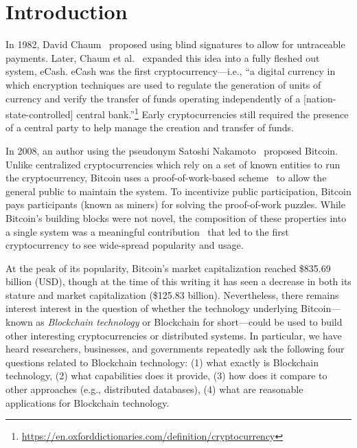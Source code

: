 
\section{Introduction}
In 1982, David Chaum~\cite{Cha82} proposed using blind signatures to allow for untraceable payments.
Later, Chaum et al.~\cite{chaum1988untraceable} expanded this idea into a fully fleshed out system, eCash.
eCash was the first cryptocurrency---i.e., ``a digital currency in which encryption techniques are used to regulate the generation of units of currency and verify the transfer of funds operating independently of a [nation-state-controlled] central bank.''\footnote{\url{https://en.oxforddictionaries.com/definition/cryptocurrency}}
Early cryptocurrencies still required the presence of a central party to help manage the creation and transfer of funds.

In 2008, an author using the pseudonym Satoshi Nakamoto~\cite{Nak08} proposed Bitcoin.
Unlike centralized cryptocurrencies which rely on a set of known entities to run the cryptocurrency, Bitcoin uses a proof-of-work-based scheme~\cite{DN93,back1997partial} to allow the general public to maintain the system.
To incentivize public participation, Bitcoin pays participants (known as miners) for solving the proof-of-work puzzles.
While Bitcoin's building blocks were not novel, the composition of these properties into a single system was a meaningful contribution~\cite{Narayanan17} that led to the first cryptocurrency to see wide-spread popularity and usage.

At the peak of its popularity, Bitcoin's market capitalization reached \$835.69 billion (USD), though at the time of this writing it has seen a decrease in both its stature and market capitalization (\$125.83 billion).
Nevertheless, there remains interest interest in the question of whether the technology underlying Bitcoin---known as \emph{Blockchain technology} or {Blockchain} for short---could be used to build other interesting cryptocurrencies or distributed systems.
In particular, we have heard researchers, businesses, and governments repeatedly ask the following four questions related to Blockchain technology: (1) what exactly is Blockchain technology, (2) what capabilities does it provide, (3) how does it compare to other approaches (e.g., distributed databases), (4) what are reasonable applications for Blockchain technology.

